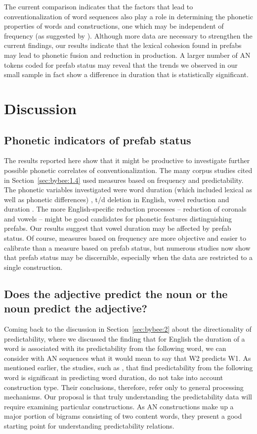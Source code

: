 \documentclass[output=paper]{langscibook}
\begin{document}
The current comparison indicates that the factors that lead to conventionalization of word sequences also play a role in determining the phonetic properties of words and constructions, one which may be independent of frequency (as suggested by \citealt{DurrantDoherty2010}). Although more data are necessary to strengthen the current findings, our results indicate that the lexical cohesion found in prefabs may lead to phonetic fusion and reduction in production. A larger number of AN tokens coded for prefab status may reveal that the trends we observed in our small sample in fact show a difference in duration that is statistically significant.

\section{Discussion}
\subsection{Phonetic indicators of prefab status}

The results reported here show that it might be productive to investigate further possible phonetic correlates of conventionalization. The many corpus studies cited in Section~\ref{sec:bybee:1.4} used measures based on frequency and predictability. The phonetic variables investigated were word duration (which included lexical as well as phonetic differences) \citep{BellJurafsky2009,Seyfarth2014,SóskuthyHay2017}, t/d deletion in English, vowel reduction and duration \citep{JurafskyEtAl2001}. The more English-specific reduction processes -- reduction of coronals and vowels -- might be good candidates for phonetic features distinguishing prefabs. Our results suggest that vowel duration may be affected by prefab status. Of course, measures based on frequency are more objective and easier to calibrate than a measure based on prefab status, but numerous studies now show that prefab status may be discernible, especially when the data are restricted to a single construction.

\subsection{Does the adjective predict the noun or the noun predict the adjective?}

Coming back to the discussion in Section~\ref{sec:bybee:2} about the directionality of predictability, where we discussed the finding that for English the duration of a word is associated with its predictability from the following word, we can consider with AN sequences what it would mean to say that W2 predicts W1. As mentioned earlier, the studies, such as \citet{BellJurafsky2009}, that find predictability from the following word is significant in predicting word duration, do not take into account construction type. Their conclusions, therefore, refer only to general processing mechanisms. Our proposal is that truly understanding the predictability data will require examining particular constructions. As AN constructions make up a major portion of bigrams consisting of two content words, they present a good starting point for understanding predictability relations. 
\end{document}
